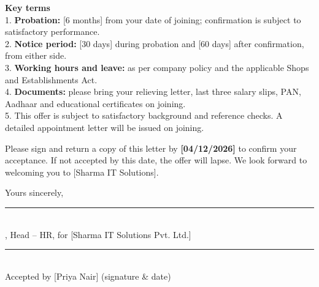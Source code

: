 \documentclass[10pt]{article}
\begin{document}
\noindent\colorbox{notebg}{\parbox{\dimexpr\linewidth-2\fboxsep}{\footnotesize {\color{accent}\bfseries Key terms}\\ 1. \textbf{Probation:} [6 months] from your date of joining; confirmation is subject to satisfactory performance.\\ 2. \textbf{Notice period:} [30 days] during probation and [60 days] after confirmation, from either side.\\ 3. \textbf{Working hours and leave:} as per company policy and the applicable Shops and Establishments Act.\\ 4. \textbf{Documents:} please bring your relieving letter, last three salary slips, PAN, Aadhaar and educational certificates on joining.\\ 5. This offer is subject to satisfactory background and reference checks. A detailed appointment letter will be issued on joining.}}\par\vspace{6pt}

Please sign and return a copy of this letter by \textbf{[04/12/2026]} to confirm your acceptance. If not accepted by this date, the offer will lapse. We look forward to welcoming you to [Sharma IT Solutions].\par\vspace{4pt}

Yours sincerely,\par\vspace{4pt}

\vspace{32pt}\noindent\parbox[t]{0.3\linewidth}{\centering\rule{\linewidth}{0.5pt}\\ [Neha Kulkarni], Head -- HR, for [Sharma IT Solutions Pvt. Ltd.]}\hfill\parbox[t]{0.3\linewidth}{\centering\rule{\linewidth}{0.5pt}\\ Accepted by [Priya Nair] (signature \& date)}\par
\end{document}
